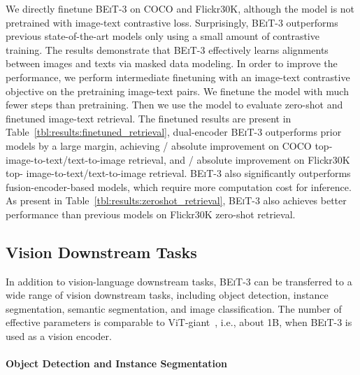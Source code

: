 \documentclass{article}
\newcommand\our{\textsc{BEiT-3}}
\begin{document}
We directly finetune \our{} on COCO and Flickr30K, although the model is not pretrained with image-text contrastive loss.
Surprisingly, \our{} outperforms previous state-of-the-art models only using a small amount of contrastive training.
The results demonstrate that \our{} effectively learns alignments between images and texts via masked data modeling. 
In order to improve the performance, we perform intermediate finetuning with an image-text contrastive objective on the pretraining image-text pairs.
We finetune the model with much fewer steps than pretraining.
Then we use the model to evaluate zero-shot and finetuned image-text retrieval.
The finetuned results are present in Table~\ref{tbl:results:finetuned_retrieval}, dual-encoder \our{} outperforms prior models by a large margin, achieving / absolute improvement on COCO top- image-to-text/text-to-image retrieval, and / absolute improvement on Flickr30K top- image-to-text/text-to-image retrieval.
\our{} also significantly outperforms fusion-encoder-based models, which require more computation cost for inference.
As present in Table~\ref{tbl:results:zeroshot_retrieval}, \our{} also achieves better performance than previous models on Flickr30K zero-shot retrieval.


\subsection{Vision Downstream Tasks}
\label{exp:vision}

In addition to vision-language downstream tasks, \our{} can be transferred to a wide range of vision downstream tasks, including object detection, instance segmentation, semantic segmentation, and image classification.
The number of effective parameters is comparable to ViT-giant~\citep{scaling:vit}, i.e., about 1B, when \our{} is used as a vision encoder.

\paragraph{Object Detection and Instance Segmentation} 
\end{document}
